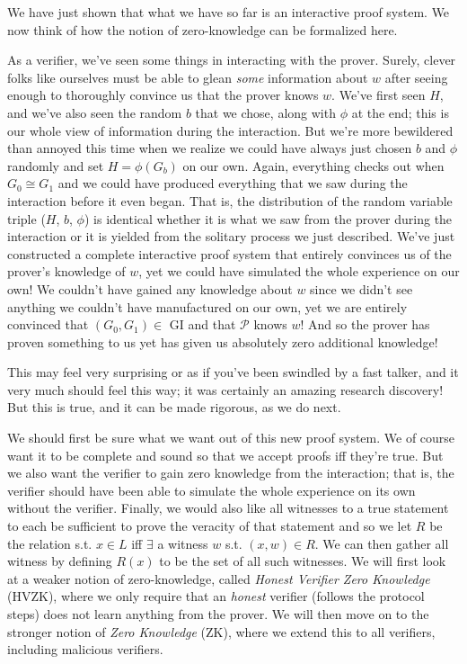 		We have just shown that what we have so far is an interactive proof system. We now think of how the notion of zero-knowledge can be formalized here.
		
		As a verifier, we've seen some things in interacting with the prover.  Surely, clever folks like ourselves must be able to glean \textit{some} information about $w$ after seeing enough to thoroughly convince us that the prover knows $w$.  We've first seen $H$, and we've also seen the random $b$ that we chose, along with $\phi$ at the end;  this is our whole view of information during the interaction.  But we're more bewildered than annoyed this time when we realize we could have always just chosen $b$ and $\phi$ randomly and set $H=\phi(G_b)$ on our own.  Again, everything checks out when $G_0 \cong G_1$ and we could have produced everything that we saw during the interaction before it even began.  That is, the distribution of the random variable triple ($H$, $b$, $\phi$) is identical whether it is what we saw from the prover during the interaction or it is yielded from the solitary process we just described.  We've just constructed a complete interactive proof system that entirely convinces us of the prover's knowledge of $w$, yet we could have simulated the whole experience on our own!  We couldn't have gained any knowledge about $w$ since we didn't see anything we couldn't have manufactured on our own, yet we are entirely convinced that $(G_0,G_1)\in$ GI and that $\mathcal{P}$ knows $w$!  And so the prover has proven something to us yet has given us absolutely zero additional knowledge!
		
		This may feel very surprising or as if you've been swindled by a fast talker, and it very much should feel this way; it was certainly an amazing research discovery!  But this is true, and it can be made rigorous, as we do next.
		
		We should first be sure what we want out of this new proof system.  We of course want it to be complete and sound so that we accept proofs iff they're true.  But we also want the verifier to gain zero knowledge from the interaction; that is, the verifier should have been able to simulate the whole experience on its own without the verifier.
		Finally, we would also like all witnesses to a true statement to each be sufficient to prove the veracity of that statement and so we let $R$ be the relation s.t. $x \in L$ iff $\exists$ a witness $w$ s.t. $(x,w)\in R$.  We can then gather all witness by defining $R(x)$ to be the set of all such witnesses. We will first look at a weaker notion of zero-knowledge, called \textit{Honest Verifier Zero Knowledge} (HVZK), where we only require that an {\em honest} verifier (follows the protocol steps) does not learn anything from the prover. We will then move on to the stronger notion of \textit{Zero Knowledge} (ZK), where we extend this to all verifiers, including malicious verifiers.
		
